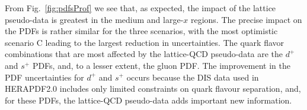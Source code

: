 From Fig.~\ref{fig:pdfsProf} we see that, as expected, the
impact of the lattice pseudo-data is greatest in the medium and large-$x$ regions.
%
The precise impact on the PDFs is rather
similar for the three scenarios, with the most optimistic
scenario C leading to the largest reduction in uncertainties.
%
The quark flavor combinations that are most affected by the
lattice-QCD pseudo-data are the $d^{+}$ and $s^{+}$ PDFs,
and, to a lesser extent, the gluon PDF.
%
The improvement in the PDF uncertainties for $d^{+}$ and $s^{+}$
occurs because the DIS data
used in HERAPDF2.0 includes only limited constraints
on quark flavour separation, and, for these PDFs, the lattice-QCD 
pseudo-data adds important new information.

